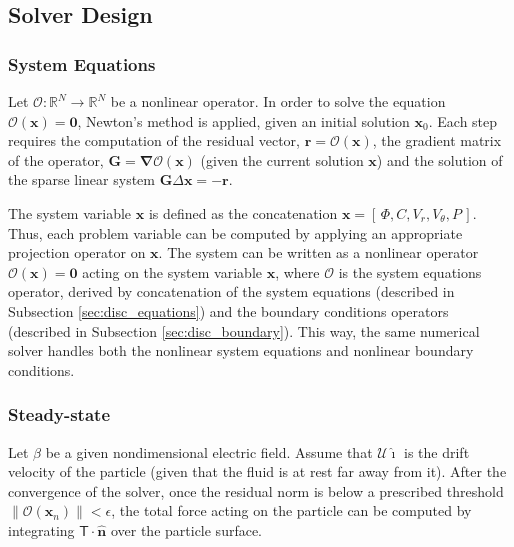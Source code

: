 \documentclass[preprint,10pt]{elsarticle}
\newcommand{\RR}{\ensuremath{\mathbb{R}}}
\newcommand\bnabla{\boldsymbol{\nabla}}
\newcommand\bn{\boldsymbol{\hat{n}}}
\newcommand\bG{\boldsymbol{G}}
\newcommand\bx{\boldsymbol{x}}
\newcommand\br{\boldsymbol{r}}
\newcommand\bzero{\boldsymbol{0}}
\newcommand\cO{\mathcal{O}}
\newcommand\cU{\mathscr{U}}
\newcommand\tT{\mathsf{T}}
\newcommand\ui{\boldsymbol{\hat{\imath}}}
\begin{document}
\subsection{Solver Design}

\subsubsection{System Equations}

Let $\cO : \RR^N \rightarrow \RR^N $ be a nonlinear operator.
In order to solve the equation $\cO(\bx) = \bzero$, Newton's method is applied, 
given an initial solution $\bx_0$.
Each step requires the computation of the residual vector, $\br = \cO(\bx)$, 
the gradient matrix of the operator, $\bG = \bnabla \cO(\bx)$
(given the current solution $\bx$)
and the solution of the sparse linear system $\bG \Delta \bx = -\br$.

The system variable $\bx$ is defined as the concatenation $\bx = [\,\varPhi, C, V_r, V_\theta, P\,]$.
Thus, each problem variable can be computed by applying an appropriate projection operator on $\bx$.
The system can be written as a nonlinear operator $\cO(\bx) = \bzero$ 
acting on the system variable ${\bx}$, 
where $\cO$ is the system equations operator, 
derived by concatenation of the system equations (described in Subsection \ref{sec:disc_equations})
and the boundary conditions operators (described in Subsection \ref{sec:disc_boundary}).
This way, the same numerical solver handles both the nonlinear system equations and nonlinear
boundary conditions.

\subsubsection{Steady-state}
Let $\beta$ be a given nondimensional electric field.
Assume that $\cU \ui$ is the drift velocity of the particle 
(given that the fluid is at rest far away from it).
After the convergence of the solver, once the residual norm is below
a prescribed threshold $\|\cO(\bx_n)\| < \epsilon$, 
the total force acting on the particle  
can be computed by integrating $\tT \cdot \bn$ over the particle surface.
\end{document}
